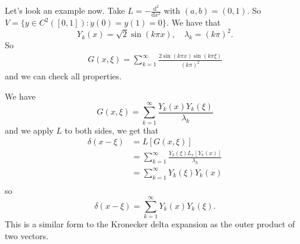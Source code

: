 \documentclass{article}
\begin{document}
Let's look an example now. Take $ L=-\frac{\mathrm d^2}{\mathrm dx^2} $ with $ (a,b)=(0,1) $. So $ V=\{y\in C^2([0,1]): y(0)=y(1)=0\} $. We have that
\[
  Y_k(x)=\sqrt 2\sin(k\pi x),\quad \lambda_k=(k\pi)^2.
\]
So
\begin{align*}
	G(x,\xi)=\sum_{k=1}^\infty \frac{2\sin(k\pi x)\sin(k\pi \xi)}{(k\pi)^2}
\end{align*}
and we can check all properties.\par
We have
\[
	G(x,\xi)=\sum_{k=1}^\infty \frac{Y_k(x)Y_k(\xi)}{\lambda_k}
\]
and we apply $ L $ to both sides, we get that
\begin{align*}
	\delta(x-\xi)&=L[G(x,\xi)]\\
		     &=\sum_{k=1}^\infty \frac{Y_k(\xi)L_x[Y_k(x)]}{\lambda_k}\\
		     &= \sum_{k=1}^\infty Y_k(\xi)Y_k(x)\\
\end{align*}
so
\[
	\delta(x-\xi)=\sum_{k=1}^\infty Y_k(x)Y_k(\xi).
\]
This is a similar form to the Kronecker delta expansion as the outer product of two vectors.
\end{document}
